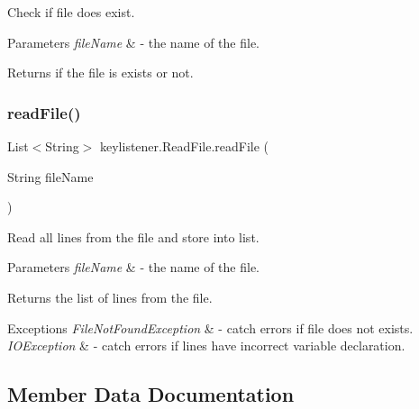 Check if file does exist. 
\begin{DoxyParams}{Parameters}
{\em file\+Name} & -\/ the name of the file. \\
\hline
\end{DoxyParams}
\begin{DoxyReturn}{Returns}
if the file is exists or not. 
\end{DoxyReturn}
\mbox{\label{classkeylistener_1_1_read_file_a889398266aa6c457b948b5ab40a2548e}} 
\subsubsection{\texorpdfstring{read\+File()}{readFile()}}
{\footnotesize\ttfamily List$<$String$>$ keylistener.\+Read\+File.\+read\+File (\begin{DoxyParamCaption}\item[{String}]{file\+Name }\end{DoxyParamCaption})\hspace{0.3cm}{\ttfamily [inline]}}

Read all lines from the file and store into list. 
\begin{DoxyParams}{Parameters}
{\em file\+Name} & -\/ the name of the file. \\
\hline
\end{DoxyParams}
\begin{DoxyReturn}{Returns}
the list of lines from the file. 
\end{DoxyReturn}

\begin{DoxyExceptions}{Exceptions}
{\em File\+Not\+Found\+Exception} & -\/ catch errors if file does not exists. \\
\hline
{\em I\+O\+Exception} & -\/ catch errors if lines have incorrect variable declaration. \\
\hline
\end{DoxyExceptions}


\subsection{Member Data Documentation}
\mbox{\label{classkeylistener_1_1_read_file_a18760d47084093fc16d97fc105c48c1e}} 
